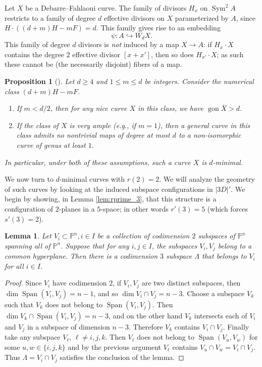 \documentclass[11pt]{amsart}
\newcommand{\PP}{\mathbb{P}}
\newcommand{\pp}{\mathbb{P}}
\DeclareMathOperator{\Sym}{Sym}
\newcommand{\gon}{\operatorname{gon}}
\newcommand{\Span}{\operatorname{Span}}
\newtheorem{lemma}[theorem]{Lemma}
\newtheorem{proposition}[theorem]{Proposition}
\theoremstyle{definition}
\theoremstyle{remark}
\begin{document}
Let $X$ be a Debarre--Fahlaoui curve.  The family of divisors $H_x$ on $\Sym^2A$ restricts to a family of degree $d$ effective divisors on $X$ parameterized by $A$, since $H \cdot ((d+m)H - mF) = d$.  This family gives rise to an embedding
\[\psi \colon A \hookrightarrow W_dX.\]
This family of degree $d$ divisors is \emph{not} induced by a map $X \to A$: if $H_x \cdot X$ contains the degree $2$ effective divisor $[x + x']$, then so does $H_{x'} \cdot X$; as such these cannot be (the necessarily disjoint) fibers of a map.

\begin{proposition}[{\cite[Propositions 5.7 and 5.14]{Debarre-Fahlaoui1993}}]\label{prop:DFs-are-minimalish}
Let $d \geqslant 4$ and $1 \leqslant m \leqslant d$ be integers.
Consider the numerical class $(d+m)H - m F$.
\begin{enumerate}
    \item If $m < d/2$, then for any nice curve $X$ in this class, we have $\gon \bar{X} > d$.
    \item If the class of $X$ is very ample (e.g., if \(m=1\)), then a general curve in this class admits no nontrivial maps of degree at most $d$ to a non-isomorphic curve of genus at least \(1\). 
\end{enumerate}
In particular, under both of these assumptions, such a curve $X$ is $d$-minimal.
\end{proposition}

\medskip

We now turn to \(d\)-minimal curves with \(r(2) = 2\).
We will analyze the geometry of such curves by looking at the induced subspace configurations in $|3D|'$.  We begin by showing, in Lemma \ref{lem:rprime_3}, that this structure is a configuration of $2$-planes in a $5$-space; in other words \(r'(3) = 5\) (which forces \(s'(3)=2\)). 

\begin{lemma}\label{lem:linear-algebra}
Let $V_i \subset \PP^n, i \in I$ be a collection of codimension \(2\) subspaces of $\PP^n$ spanning all of \(\pp^n\). Suppose that for any $i, j \in I$, the subspaces $V_i, V_j$ belong to a common hyperplane. Then there is a codimension $3$ subspace $\Lambda$ that belongs to $V_i$ for all $i \in I$. 
\end{lemma}
\begin{proof}
Since $V_i$ have codimension $2$, if $V_i, V_j$ are two distinct subspaces, then $\dim \Span (V_i, V_j)=n-1$, and so $\dim V_i \cap V_j = n-3$. Choose a subspace $V_k$ such that $V_k$ does not belong to $\Span (V_i, V_j)$. Then $\dim V_k \cap \Span (V_i, V_j) = n-3$, and on the other hand $V_k$ intersects each of $V_i$ and $V_j$ in a subspace of dimension $n-3$. Therefore $V_k$ contains $V_i \cap V_j$. Finally take any subspace $V_\ell$, $\ell \neq i,j,k$. Then $V_\ell$ does not belong to $\Span (V_u, V_w)$ for some $u,w \in \{i,j,k\}$ and by the previous argument $V_\ell$ contains $V_u \cap V_w = V_i \cap V_j$. Thus $\Lambda=V_i \cap V_j$ satisfies the conclusion of the lemma.
\end{proof}
\end{document}
